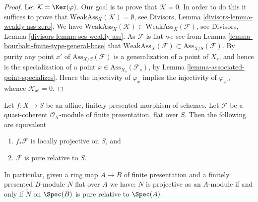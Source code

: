 \begin{proof}
Let $\mathcal{K} = \Ker(\varphi)$. Our goal is to prove that
$\mathcal{K} = 0$. In order to do this it suffices to prove that
$\text{WeakAss}_X(\mathcal{K}) = \emptyset$, see
Divisors, Lemma \ref{divisors-lemma-weakly-ass-zero}.
We have
$\text{WeakAss}_X(\mathcal{K}) \subset \text{WeakAss}_X(\mathcal{F})$, see
Divisors, Lemma \ref{divisors-lemma-ses-weakly-ass}.
As $\mathcal{F}$ is flat we see from
Lemma \ref{lemma-bourbaki-finite-type-general-base}
that $\text{WeakAss}_X(\mathcal{F}) \subset \text{Ass}_{X/S}(\mathcal{F})$.
By purity any point $x'$ of $\text{Ass}_{X/S}(\mathcal{F})$
is a generalization of a point of $X_s$, and hence is the
specialization of a point $x \in \text{Ass}_{X_s}(\mathcal{F}_s)$, by
Lemma \ref{lemma-associated-point-specializes}.
Hence the injectivity of $\varphi_x$ implies the injectivity of
$\varphi_{x'}$, whence $\mathcal{K}_{x'} = 0$.
\end{proof}

\begin{proposition}
\label{proposition-finite-presentation-flat-pure-is-projective}
Let $f : X \to S$ be an affine, finitely presented morphism of schemes.
Let $\mathcal{F}$ be a quasi-coherent $\mathcal{O}_X$-module of
finite presentation, flat over $S$. Then the following
are equivalent
\begin{enumerate}
\item $f_*\mathcal{F}$ is locally projective on $S$, and
\item $\mathcal{F}$ is pure relative to $S$.
\end{enumerate}
In particular, given a ring map $A \to B$ of finite presentation and
a finitely presented $B$-module $N$ flat over $A$ we have:
$N$ is projective as an $A$-module if and only if $\widetilde{N}$
on $\Spec(B)$ is pure relative to $\Spec(A)$.
\end{proposition}

